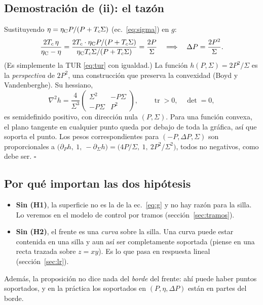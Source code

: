 \subsection{Demostración de (ii): el tazón}

Sustituyendo $\eta = \eta_{\mathrm{C}} P/(P+T_c\Sigma)$ (ec.~\ref{eq:sigma}) en $g$:
\[
\frac{2T_c\,\eta}{\eta_{\mathrm{C}}-\eta} = \frac{2T_c\cdot\eta_{\mathrm{C}} P/(P+T_c\Sigma)}{\eta_{\mathrm{C}} T_c\Sigma/(P+T_c\Sigma)}
= \frac{2P}{\Sigma}
\quad\Longrightarrow\quad
\Delta P = \frac{2P^2}{\Sigma}.
\]
(Es simplemente la TUR \eqref{eq:tur} con igualdad.) La función $h(P,\Sigma) = 2P^2/\Sigma$ es la
\emph{perspectiva} de $2P^2$, una construcción que preserva la convexidad (Boyd y Vandenberghe). Su
hessiano,
\begin{equation}
\nabla^2 h = \frac{4}{\Sigma^3}\begin{pmatrix}\Sigma^2 & -P\Sigma\\ -P\Sigma & P^2\end{pmatrix},
\qquad \operatorname{tr} > 0,\quad \det = 0,
\end{equation}
es semidefinido positivo, con dirección nula $(P,\Sigma)$. Para una función convexa, el plano
tangente en cualquier punto queda por debajo de toda la gráfica, así que soporta el punto. Los pesos
correspondientes para $(-P,\Delta P,\Sigma)$ son proporcionales a
$\bigl(\partial_P h,\ 1,\ -\partial_\Sigma h\bigr) = \bigl(4P/\Sigma,\ 1,\ 2P^2/\Sigma^2\bigr)$, todos no
negativos, como debe ser. \hfill$\square$

\subsection{Por qué importan las dos hipótesis}

\begin{itemize}
\item \textbf{Sin (H1)}, la superficie no es la de la ec.~\eqref{eq:g} y no hay razón para la silla.
  Lo veremos en el modelo de control por tramos (sección~\ref{sec:tramos}).
\item \textbf{Sin (H2)}, el frente es una \emph{curva} sobre la silla. Una curva puede estar contenida
  en una silla y aun así ser completamente soportada (piense en una recta trazada sobre $z=xy$). Es
  lo que pasa en respuesta lineal (sección~\ref{sec:lr}).
\end{itemize}
Además, la proposición no dice nada del \emph{borde} del frente: ahí puede haber puntos soportados,
y en la práctica los soportados en $(P,\eta,\Delta P)$ están en partes del borde.

